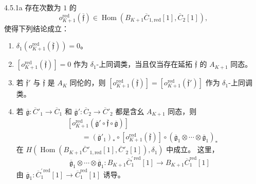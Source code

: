 \begin{theorem}{4.5.1a}\label{thm:4-5-1a}
存在次数为 $1$ 的
\[
 o^{\mathrm{red}}_{K+1}(\overline{\mathfrak f})
 \in\operatorname{Hom}
 (B_{K+1}\overline C_{1,\mathrm{red}}[1],
  \overline C_2[1]),
\]
使得下列结论成立：
\begin{enumerate}[label=\textup{(4.5.2a.\arabic*)},leftmargin=6.1em]
 \item
 $\delta_1(o^{\mathrm{red}}_{K+1}
 (\overline{\mathfrak f}))=0$。
 \item
 $[o^{\mathrm{red}}_{K+1}(\overline{\mathfrak f})]=0$
 作为 $\delta_1$-上同调类，当且仅当存在延拓
 $\overline{\mathfrak f}$ 的 $A_{K+1}$ 同态。
 \item
 若 $\overline{\mathfrak f}'$ 与
 $\overline{\mathfrak f}$ 是 $A_K$ 同伦的，则
 $[o^{\mathrm{red}}_{K+1}(\overline{\mathfrak f})]
 =[o^{\mathrm{red}}_{K+1}(\overline{\mathfrak f}')]$
 作为 $\delta_1$-上同调类。
 \item
 若 $\overline{\mathfrak g}\colon
 \overline C'_1\to\overline C_1$ 和
 $\overline{\mathfrak g}'\colon
 \overline C_2\to\overline C'_2$
 都是含幺 $A_{K+1}$ 同态，则
 \[
 \begin{aligned}
 &[o^{\mathrm{red}}_{K+1}
   (\overline{\mathfrak g}'\circ
    \overline{\mathfrak f}\circ\overline{\mathfrak g})]\\
 &\qquad=
 (\overline{\mathfrak g}'_1)_*
 \circ[o^{\mathrm{red}}_{K+1}(\overline{\mathfrak f})]
 \circ(\overline{\mathfrak g}_1\otimes\cdots
 \otimes\overline{\mathfrak g}_1)_*
 \end{aligned}
 \]
 在
 $H(\operatorname{Hom}
 (B_{K+1}\overline C'_{1,\mathrm{red}}[1],
 \overline C'_2[1]),\delta_1)$
 中成立。
 这里，
 \[
 \overline{\mathfrak g}_1\otimes\cdots
 \otimes\overline{\mathfrak g}_1\colon
 B_{K+1}\overline C_{1}^{\prime\,\mathrm{red}}[1]
 \longrightarrow B_{K+1}\overline C_{1}^{\mathrm{red}}[1]
 \]
 由 $\overline{\mathfrak g}_1\colon
 \overline C_{1}^{\prime\,\mathrm{red}}[1]\to
 \overline C_{1}^{\mathrm{red}}[1]$ 诱导。
\end{enumerate}
\end{theorem}

